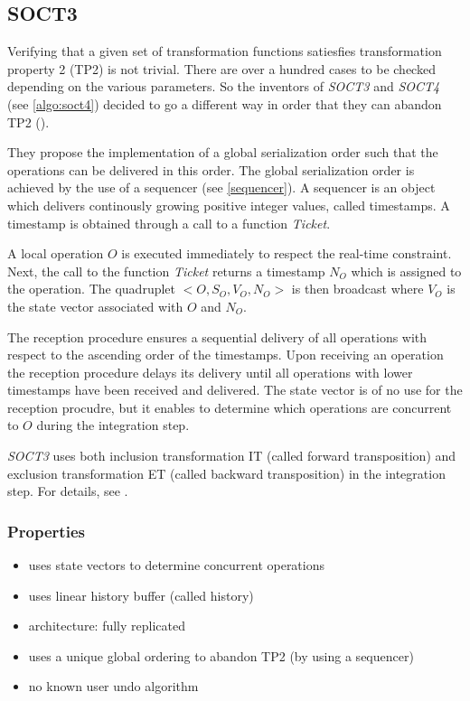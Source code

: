 \subsection{SOCT3}
\label{algo:soct3}

Verifying that a given set of transformation functions satiesfies transformation property 2 (TP2) is not trivial. There are over a hundred cases to be checked depending on the various parameters. So the inventors of \emph{SOCT3} and \emph{SOCT4} (see \ref{algo:soct4}) decided to go a different way in order that they can abandon TP2 (\cite{suleiman00}).

They propose the implementation of a global serialization order such that the operations can be delivered in this order. The global serialization order is achieved by the use of a sequencer (see \ref{sequencer}). A sequencer is an object which delivers continously growing positive integer values, called timestamps. A timestamp is obtained through a call to a function \emph{Ticket}.

A local operation $O$ is executed immediately to respect the real-time constraint. Next, the call to the function \emph{Ticket} returns a timestamp $N_{O}$ which is assigned to the operation. The quadruplet $<O,S_{O},V_{O},N_{O}>$ is then broadcast where $V_{O}$ is the state vector associated with $O$ and $N_{O}$.

The reception procedure ensures a sequential delivery of all operations with respect to the ascending order of the timestamps. Upon receiving an operation the reception procedure delays its delivery until all operations with lower timestamps have been received and delivered. The state vector is of no use for the reception procudre, but it enables to determine which operations are concurrent to $O$ during the integration step.

\emph{SOCT3} uses both inclusion transformation IT (called forward transposition) and exclusion transformation ET (called backward transposition) in the integration step. For details, see \cite{suleiman00}.


\subsubsection{Properties}
\begin{itemize}
 \item uses state vectors to determine concurrent operations
 \item uses linear history buffer (called history)
 \item architecture: fully replicated
 \item uses a unique global ordering to abandon TP2 (by using a sequencer)
 \item no known user undo algorithm
\end{itemize}
